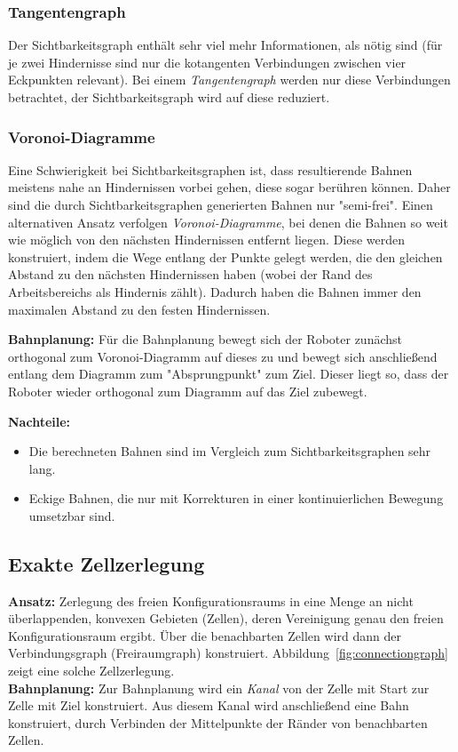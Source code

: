 			\subsubsection{Tangentengraph}
				Der Sichtbarkeitsgraph enthält sehr viel mehr Informationen, als nötig sind (für je zwei Hindernisse sind nur die kotangenten Verbindungen zwischen vier Eckpunkten relevant). Bei einem \emph{Tangentengraph} werden nur diese Verbindungen betrachtet, \dh der Sichtbarkeitsgraph wird auf diese reduziert.

			\subsubsection{Voronoi-Diagramme}
				Eine Schwierigkeit bei Sichtbarkeitsgraphen ist, dass resultierende Bahnen meistens nahe an Hindernissen vorbei gehen, diese sogar berühren können. Daher sind die durch Sichtbarkeitsgraphen generierten Bahnen nur "semi-frei". Einen alternativen Ansatz verfolgen \emph{Voronoi-Diagramme}, bei denen die Bahnen so weit wie möglich von den nächsten Hindernissen entfernt liegen. Diese werden konstruiert, indem die Wege entlang der Punkte gelegt werden, die den gleichen Abstand zu den nächsten Hindernissen haben (wobei der Rand des Arbeitsbereichs als Hindernis zählt). Dadurch haben die Bahnen immer den maximalen Abstand zu den festen Hindernissen.
				
				\textbf{Bahnplanung:} Für die Bahnplanung bewegt sich der Roboter zunächst orthogonal zum Voronoi-Diagramm auf dieses zu und bewegt sich anschließend entlang dem Diagramm zum "Absprungpunkt" zum Ziel. Dieser liegt so, dass der Roboter wieder orthogonal zum Diagramm auf das Ziel zubewegt.
				
				\textbf{Nachteile:}
				\begin{itemize}
					\item Die berechneten Bahnen sind im Vergleich zum Sichtbarkeitsgraphen sehr lang.
					\item Eckige Bahnen, die nur mit Korrekturen in einer kontinuierlichen Bewegung umsetzbar sind.
				\end{itemize}

		\subsection{Exakte Zellzerlegung}
			\textbf{Ansatz:} Zerlegung des freien Konfigurationsraums in eine Menge an nicht überlappenden, konvexen Gebieten (Zellen), deren Vereinigung genau den freien Konfigurationsraum ergibt. Über die benachbarten Zellen wird dann der Verbindungsgraph (Freiraumgraph) konstruiert. Abbildung~\ref{fig:connectiongraph} zeigt eine solche Zellzerlegung. \\
			\textbf{Bahnplanung:} Zur Bahnplanung wird ein \emph{Kanal} von der Zelle mit Start zur Zelle mit Ziel konstruiert. Aus diesem Kanal wird anschließend eine Bahn konstruiert, \bspw durch Verbinden der Mittelpunkte der Ränder von benachbarten Zellen.
			

